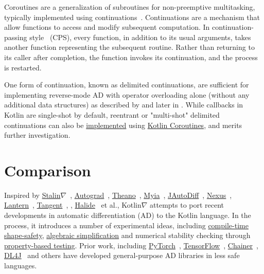 Coroutines are a generalization of subroutines for non-preemptive multitasking, typically implemented using continuations~\citep{haynes1984continuations}. Continuations are a mechanism that allow functions to access and modify subsequent computation. In continuation-passing style~\citep{sussman1975scheme} (CPS), every function, in addition to its usual arguments, takes another function representing the subsequent routine. Rather than returning to its caller after completion, the function invokes its continuation, and the process is restarted.

One form of continuation, known as delimited continuations, are sufficient for implementing reverse-mode AD with operator overloading alone (without any additional data structures) as described by \citet{wang2018demystifying} and later in \citet{wang2018backpropagation}. While callbacks in Kotlin are single-shot by default, reentrant or "multi-shot" delimited continuations can also be \href{https://gist.github.com/elizarov/ddee47f927dda500dc493e945128d661}{implemented} using \href{https://kotlinlang.org/docs/reference/coroutines-overview.html}{Kotlin Coroutines}, and merits further investigation.

\section{Comparison}\label{sec:comparison}

Inspired by \href{https://github.com/Functional-AutoDiff/STALINGRAD}{Stalin$\nabla$}~\citep{pearlmutter2008using}, \href{https://github.com/HIPS/autograd/}{Autograd}~\citep{maclaurin2015autograd, maclaurin2016phd}, \href{http://deeplearning.net/software/theano/}{Theano}~\citep{bergstra2010theano}, \href{https://github.com/mila-iqia/myia}{Myia}~\citep{breuleux2017automatic, vanmerrienboer2018ad}, \href{https://github.com/uniker9/JAutoDiff/}{JAutoDiff}~\citep{nureki2012jautodiff}, \href{https://tongfei.me/nexus/}{Nexus}~\citep{chen2017typesafe}, \href{https://feiwang3311.github.io/Lantern/}{Lantern}~\citep{wang2018demystifying}, \href{https://github.com/google/tangent}{Tangent}~\citep{van2018tangent}, \citet{elliott2018simple}, \href{https://people.csail.mit.edu/tzumao/gradient_halide/}{Halide}~\citep{li2018halide} et al., Kotlin$\nabla$ attempts to port recent developments in automatic differentiation (AD) to the Kotlin language. In the process, it introduces a number of experimental ideas, including \hyperref[sec:shape-safety]{compile-time shape-safety}, \hyperref[sec:multiple-dispatch]{algebraic simplification} and numerical stability checking through \hyperref[sec:testing]{property-based testing}. Prior work, including \href{https://pytorch.org/}{PyTorch}~\citep{paszke2019pytorch}, \href{https://www.tensorflow.org/}{TensorFlow}~\citep{abadi2016tensorflow}, \href{https://chainer.org/}{Chainer}~\citep{chainer}, \href{https://deeplearning4j.org/}{DL4J}~\cite{team2016dl4j} and others have developed general-purpose AD libraries in less safe languages.

